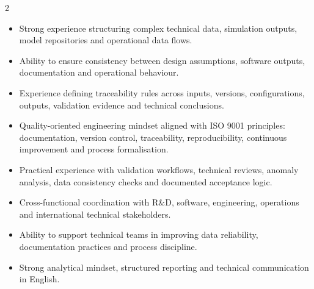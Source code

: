 \documentclass[8pt,a4paper,ragged2e,withhyper]{altacv}
\begin{document}
\begin{paracol}{2}
\begin{itemize}
  \item Strong experience structuring complex technical data, simulation outputs, model repositories and operational data flows.
  \item Ability to ensure consistency between design assumptions, software outputs, documentation and operational behaviour.
  \item Experience defining traceability rules across inputs, versions, configurations, outputs, validation evidence and technical conclusions.
  \item Quality-oriented engineering mindset aligned with ISO 9001 principles: documentation, version control, traceability, reproducibility, continuous improvement and process formalisation.
  \item Practical experience with validation workflows, technical reviews, anomaly analysis, data consistency checks and documented acceptance logic.
  \item Cross-functional coordination with R\&D, software, engineering, operations and international technical stakeholders.
  \item Ability to support technical teams in improving data reliability, documentation practices and process discipline.
  \item Strong analytical mindset, structured reporting and technical communication in English.
\end{itemize}


\divider
{}
\divider

\medskip



\divider


\divider


\divider




\end{paracol}
\end{document}
